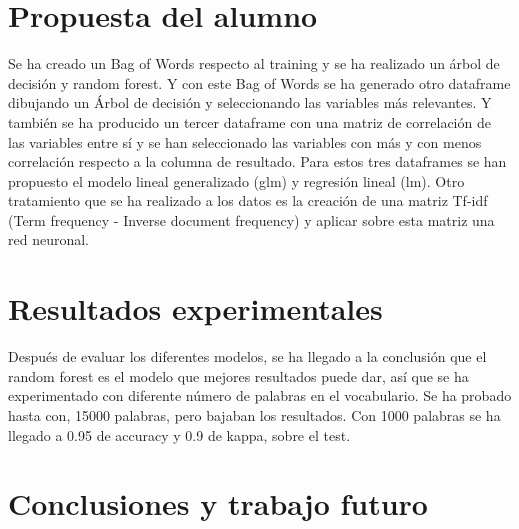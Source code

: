 \documentclass[11pt,a4paper]{article}
\begin{document}
\section{Propuesta del alumno}


Se ha creado un Bag of Words respecto al training y se ha realizado un árbol de decisión y random forest. Y con este Bag of Words se ha generado otro dataframe dibujando un Árbol de decisión y seleccionando las variables más relevantes. Y también se ha producido un tercer dataframe con una matriz de correlación de las variables entre sí y se han seleccionado las variables con más y con menos correlación respecto a la columna de resultado. Para estos tres dataframes se han propuesto el modelo lineal generalizado (glm) y regresión lineal (lm). Otro tratamiento que se ha realizado a los datos es la creación de una matriz Tf-idf (Term frequency - Inverse document frequency) y aplicar sobre esta matriz una red neuronal.









\section{Resultados experimentales}

Después de evaluar los diferentes modelos, se ha llegado a la conclusión que el random forest es el modelo que mejores resultados puede dar, así que se ha experimentado con diferente número de palabras en el vocabulario. Se ha probado hasta con, 15000 palabras, pero bajaban los resultados. Con 1000 palabras se ha llegado a 0.95 de accuracy y 0.9 de kappa, sobre el test.



\section{Conclusiones y trabajo futuro}
\end{document}
